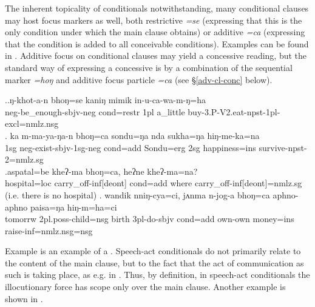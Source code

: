 The inherent topicality of conditionals notwithstanding, many conditional clauses may host focus markers as well, both restrictive \emph{=se} (expressing that this is the only condition under which the main clause obtains) or additive \emph{=ca} (expressing that the condition is added to all conceivable conditions). Examples can be found in \Next. Additive focus on conditional clauses may yield a concessive reading, but the standard way of expressing  a concessive is by a combination of the sequential marker \emph{=hoŋ} and additive focus particle \emph{=ca} (see §\ref{adv-cl-conc} below).

\ex.\ag.\label{ex-ngkhotan}ŋ-khot-a-n  bhoŋ=se          kaniŋ   mimik    in-u-ca-wa-m-ŋ=ha\\
{\sc neg-}be\_enough{\sc [3sg]-sbjv-neg} {\sc cond=restr} {\sc 1pl} a\_little buy{\sc -3.P-V2.eat-npst-1pl-excl=nmlz.nsg}\\
 
\bg. ka  m-ma-ya-ŋa-n bhoŋ=ca  sondu=ŋa    nda sukha=ŋa   hiŋ-me-ka=na\\
{\sc 1sg} {\sc neg-}exist{\sc -sbjv-1sg-neg} {\sc cond=add} Sondu{\sc =erg} {\sc 2sg} happiness{\sc =ins} survive{\sc -npst-2=nmlz.sg}\\
 
\bg.aspatal=be     kheʔ-ma    bhoŋ=ca,       heʔne kheʔ-ma=na?\\
hospital{\sc =loc} carry\_off{\sc -inf[deont]} {\sc cond=add} where carry\_off{\sc -inf[deont]=nmlz.sg} \\
 (i.e. there is no hospital) 
\bg. wandik nniŋ-cya=ci, jʌnma n-jog-a bhoŋ=ca   aphno-aphno paisa=ŋa hiŋ-m=ha=ci\\
tomorrw {\sc 2pl.poss-}child{\sc =nsg} birth  {\sc 3pl-}do{\sc -sbjv} {\sc cond=add} own-own money{\sc =ins} raise{\sc -inf=nmlz.nsg=nsg}\\
 

Example \Last[c] is an example of a  \citep[267]{Thompsonetal2007_Adverbial}. Speech-act conditionals do not primarily relate to the content of the main clause, but to the fact that the act of communication as such is taking place, as e.g. in . Thus, by definition, in  speech-act conditionals the illocutionary force has scope only over the main clause. Another example is shown in \Next. 

